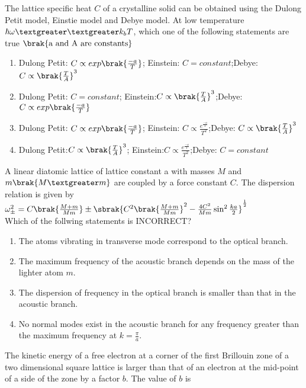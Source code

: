 {{}
\item{
The lattice specific heat $C$ of a crystalline solid can be obtained using the Dulong Petit model, Einstie model and Debye model. At low temperature $\hbar\omega\textgreater\textgreater k_bT$, which one of the following statements are true $\brak{\text{a and A are constants}}$
\begin{enumerate}
\item Dulong Petit: $C\propto exp\brak{\frac{-a}{T}}$; Einstein: $C=constant$;Debye: $C\propto\brak{\frac{T}{A}}^3$
\item Dulong Petit: $C=constant$; Einstein:$C\propto\brak{\frac{T}{A}}^3$;Debye:  $C\propto exp\brak{\frac{-a}{T}}$
\item Dulong Petit: $C\propto exp\brak{\frac{-a}{T}}$; Einstein:  $C\propto\frac{e^{\frac{-a}{T}}}{T^2}$;Debye: $C\propto\brak{\frac{T}{A}}^3$
\item Dulong Petit:$C\propto\brak{\frac{T}{A}}^3$; Einstein:$C\propto\frac{e^{\frac{-a}{T}}}{T^2}$;Debye: $C=constant$ 
\end{enumerate}
}
\item{
A linear diatomic lattice of lattice constant a with masses $M$ and $m\brak{M\textgreater m}$ are coupled by a force constant $C$. The dispersion relation is given by\\
$\omega_\pm^2=C\brak{\frac{M+m}{Mm}}\pm\sbrak{C^2\brak{\frac{M+m}{Mm}}^2-\frac{4C^2}{Mm}\sin^2\frac{ka}{2}}^{\frac{1}{2}}$\\
Which of the follwing statements is INCORRECT?
\begin{enumerate}
\item The atoms vibrating in transverse mode correspond to the optical branch.
\item The maximum frequency of the acoustic branch depends on the mass of the lighter atom $m$.
\item The dispersion of frequency in the optical branch is smaller than that in the acoustic branch.
\item No normal modes exist in the acoustic branch for any frequency greater than the maximum frequency at $k=\frac{\pi}{a}$.
\end{enumerate}
}
\item{
The kinetic energy of a free electron at a corner of the first Brillouin zone of a two dimensional square lattice is larger than that of an electron at the mid-point of a side of the zone by a factor $b$. The value of $b$ is 
\begin{multicols}{4}
\begin{enumerate}

\end{enumerate}
\end{multicols}}}
